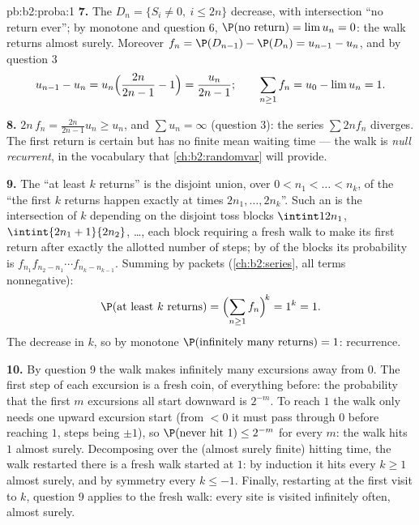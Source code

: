 \begin{solution}{pb:b2:proba:1}
\textbf{7.} The  $D_n = \{S_i \neq 0,\ i \leq 2n\}$
decrease, with intersection ``no return ever''; by monotone
 and question 6, $\P(\text{no return}) = \lim u_n =
0$: the walk returns almost surely. Moreover $f_n = \P(D_{n-1})
- \P(D_n) = u_{n-1} - u_n$, and by question 3
\[
u_{n-1} - u_n = u_n\Bigl(\frac{2n}{2n-1} - 1\Bigr) =
\frac{u_n}{2n-1};
\qquad
\sum_{n\geq1}f_n = u_0 - \lim u_n = 1 .
\]

\textbf{8.} $2n\,f_n = \frac{2n}{2n-1}u_n \geq u_n$, and
$\sum u_n = \infty$ (question 3): the series $\sum 2nf_n$
diverges. The first return is certain but has no finite mean
waiting time --- the walk is \emph{null recurrent}, in the
vocabulary that \cref{ch:b2:randomvar} will provide.

\textbf{9.} The  ``at least $k$ returns'' is the
disjoint  union, over $0 < n_1 < \dots < n_k$, of
the  ``the first $k$ returns happen exactly at times
$2n_1, \dots, 2n_k$''. Such an  is the intersection of
$k$  depending on the disjoint toss blocks
$\intint1{2n_1}$, $\intint{2n_1+1}{2n_2}$, \dots, each block
requiring a fresh walk to make its first return after
exactly the allotted number of steps; by  of the
blocks its probability is $f_{n_1}f_{n_2-n_1}\cdots
f_{n_k-n_{k-1}}$. Summing by packets (\cref{ch:b2:series},
all terms nonnegative):
\[
\P(\text{at least }k\text{ returns})
= \Bigl(\sum_{n\geq1}f_n\Bigr)^{\!k} = 1^k = 1 .
\]
The  decrease in $k$, so by monotone 
$\P(\text{infinitely many returns}) = 1$: recurrence.

\textbf{10.} By question 9 the walk makes infinitely many
excursions away from $0$. The first step of each excursion is
a fresh coin,  of everything before: the
probability that the first $m$ excursions all start downward
is $2^{-m}$. To reach $1$ the walk only needs one upward
excursion start (from $<0$ it must pass through $0$ before
reaching $1$, steps being $\pm1$), so $\P(\text{never hit }1)
\leq 2^{-m}$ for every $m$: the walk hits $1$ almost surely.
Decomposing over the (almost surely finite) hitting time, the
walk restarted there is a fresh walk started at $1$: by
induction it hits every $k \geq 1$ almost surely, and by
symmetry every $k \leq -1$. Finally, restarting at the first
visit to $k$, question 9 applies to the fresh walk: every
site is visited infinitely often, almost surely.


\end{solution}

